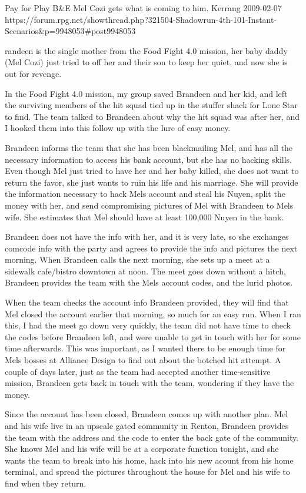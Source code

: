 \begin{scenario}{Pay for Play}
	{B\&E}
	{Mel Cozi gets what is coming to him.}
	{Kerrang}
	{2009-02-07}
	{https://forum.rpg.net/showthread.php?321504-Shadowrun-4th-101-Instant-Scenarios\&p=9948053#post9948053}

  randeen is the single mother from the Food Fight 4.0 mission, her baby daddy (Mel Cozi) just tried to off her and their son to keep her quiet, and now she is out for revenge.

\synopsis In the Food Fight 4.0 mission, my group saved Brandeen and her kid, and left the surviving members of the hit squad tied up in the stuffer shack for Lone Star to find. The team talked to Brandeen about why the hit squad was after her, and I hooked them into this follow up with the lure of easy money.

Brandeen informs the team that she has been blackmailing Mel, and has all the necessary information to access his bank account, but she has no hacking skills. Even though Mel just tried to have her and her baby killed, she does not want to return the favor, she just wants to ruin his life and his marriage. She will provide the information necessary to hack Mels account and steal his Nuyen, split the money with her, and send compromising pictures of Mel with Brandeen to Mels wife. She estimates that Mel should have at least 100,000 Nuyen in the bank.

Brandeen does not have the info with her, and it is very late, so she exchanges comcode info with the party and agrees to provide the info and pictures the next morning. When Brandeen calls the next morning, she sets up a meet at a sidewalk cafe/bistro downtown at noon. The meet goes down without a hitch, Brandeen provides the team with the Mels account codes, and the lurid photos.

When the team checks the account info Brandeen provided, they will find that Mel closed the account earlier that morning, so much for an easy run. When I ran this, I had the meet go down very quickly, the team did not have time to check the codes before Brandeen left, and were unable to get in touch with her for some time afterwards. This was important, as I wanted there to be enough time for Mels bosses at Alliance Design to find out about the botched hit attempt. A couple of days later, just as the team had accepted another time-sensitive mission, Brandeen gets back in touch with the team, wondering if they have the money.

Since the account has been closed, Brandeen comes up with another plan. Mel and his wife live in an upscale gated community in Renton, Brandeen provides the team with the address and the code to enter the back gate of the community. She knows Mel and his wife will be at a corporate function tonight, and she wants the team to break into his home, hack into his new acount from his home terminal, and spread the pictures throughout the house for Mel and his wife to find when they return.


\end{scenario}
